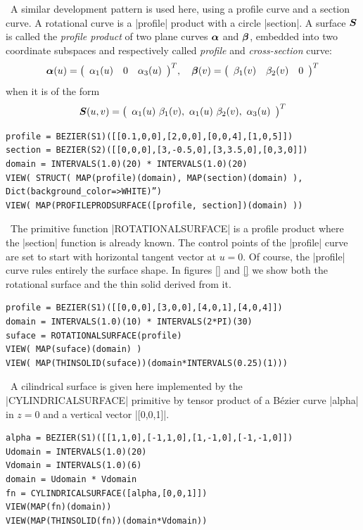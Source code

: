 \begin{coding}[Algebraic computation of FE = $\delta_1$]
\begin{condition}\ A similar development pattern is used here, using a profile curve and a section curve. A rotational curve is a |profile| product with a circle |section|. A surface ${\mbox{\boldmath $S$}}$ is called the {\it profile
product} of two plane curves ${\mbox{\boldmath $\alpha$}}$ and ${\mbox{\boldmath $\beta$}}$, embedded
into two coordinate subspaces and respectively called {\it profile}
and {\it cross-section} curve:
\[ 
{\mbox{\boldmath $\alpha$}}(u) = {\left(\begin{array}{cccccccc}\alpha_1(u) & 0 & \alpha_3(u)\end{array}\right)}^{T}, \quad
{\mbox{\boldmath $\beta$}}(v) = {\left(\begin{array}{cccccccc}\beta_1(v) & \beta_2(v) & 0\end{array}\right)}^{T}
\]
when it is of the form
\[
{\mbox{\boldmath $S$}}(u,v) = 
{\left(\begin{array}{cccccccc}\alpha_1(u)\ \beta_1(v), \  \alpha_1(u)\ \beta_2(v), \  
\alpha_3(u)\end{array}\right)}^{T}
\]
\begin{lstlisting}[language=JuliaLocal, style=julia, mathescape=true]
profile = BEZIER(S1)([[0.1,0,0],[2,0,0],[0,0,4],[1,0,5]])
section = BEZIER(S2)([[0,0,0],[3,-0.5,0],[3,3.5,0],[0,3,0]])
domain = INTERVALS(1.0)(20) * INTERVALS(1.0)(20)
VIEW( STRUCT( MAP(profile)(domain), MAP(section)(domain) ), Dict(background_color=>WHITE)”)
VIEW( MAP(PROFILEPRODSURFACE([profile, section])(domain) ))
\end{lstlisting}
\end{condition}

\begin{condition}[Rotational surface and solid]\
The primitive function |ROTATIONALSURFACE| is a profile product where the |section| function is already known. The control points of the |profile| curve are set to start with horizontal tangent vector at $u=0$. Of course, the |profile| curve rules entirely the surface shape. In figures \ref{} and \ref{} we show both the rotational surface and the thin solid derived from it.
\begin{lstlisting}[language=JuliaLocal, style=julia, mathescape=true]
profile = BEZIER(S1)([[0,0,0],[3,0,0],[4,0,1],[4,0,4]]) 
domain = INTERVALS(1.0)(10) * INTERVALS(2*PI)(30)
suface = ROTATIONALSURFACE(profile)
VIEW( MAP(suface)(domain) )
VIEW( MAP(THINSOLID(suface))(domain*INTERVALS(0.25)(1))) 
\end{lstlisting}
\end{condition}

\begin{condition}\
A cilindrical surface is given here implemented by the |CYLINDRICALSURFACE| primitive by tensor product of a Bézier curve |alpha| in $z=0$ and a vertical vector |[0,0,1]|. 
\begin{lstlisting}[language=JuliaLocal, style=julia, mathescape=true]
alpha = BEZIER(S1)([[1,1,0],[-1,1,0],[1,-1,0],[-1,-1,0]])
Udomain = INTERVALS(1.0)(20)
Vdomain = INTERVALS(1.0)(6)
domain = Udomain * Vdomain
fn = CYLINDRICALSURFACE([alpha,[0,0,1]])
VIEW(MAP(fn)(domain))
VIEW(MAP(THINSOLID(fn))(domain*Vdomain))
\end{lstlisting}
\end{condition}


\end{coding}
